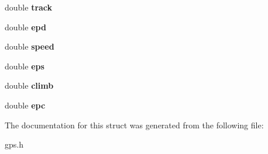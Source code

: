 \begin{DoxyCompactItemize}
\item 
\hypertarget{structgps__fix__t_ae4eed278e272a8df3de76d6f0ff0c80a}{double {\bfseries track}}\label{structgps__fix__t_ae4eed278e272a8df3de76d6f0ff0c80a}

\item 
\hypertarget{structgps__fix__t_ac78678d94736f6bac04e1cb44aeda1dc}{double {\bfseries epd}}\label{structgps__fix__t_ac78678d94736f6bac04e1cb44aeda1dc}

\item 
\hypertarget{structgps__fix__t_ad730a329f85f4e3d531b43103192e8f8}{double {\bfseries speed}}\label{structgps__fix__t_ad730a329f85f4e3d531b43103192e8f8}

\item 
\hypertarget{structgps__fix__t_a269f2d34b050043a984eb246dd2b2f6b}{double {\bfseries eps}}\label{structgps__fix__t_a269f2d34b050043a984eb246dd2b2f6b}

\item 
\hypertarget{structgps__fix__t_a5071b2b33fc0419ff2d92918d3f92de3}{double {\bfseries climb}}\label{structgps__fix__t_a5071b2b33fc0419ff2d92918d3f92de3}

\item 
\hypertarget{structgps__fix__t_a02b4e9a7fad04fcd9583e5ddfb2584d7}{double {\bfseries epc}}\label{structgps__fix__t_a02b4e9a7fad04fcd9583e5ddfb2584d7}

\end{DoxyCompactItemize}


\-The documentation for this struct was generated from the following file\-:\begin{DoxyCompactItemize}
\item 
gps.\-h\end{DoxyCompactItemize}
